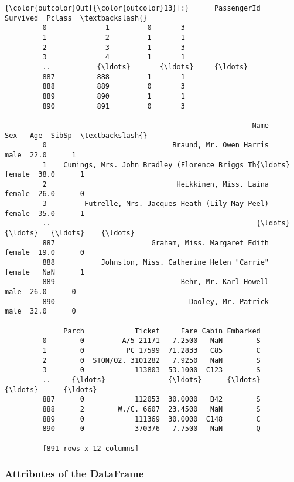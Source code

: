 \documentclass[11pt]{article}
\begin{document}
\begin{Verbatim}[commandchars=\\\{\}]
{\color{outcolor}Out[{\color{outcolor}13}]:}      PassengerId  Survived  Pclass  \textbackslash{}
         0              1         0       3   
         1              2         1       1   
         2              3         1       3   
         3              4         1       1   
         ..           {\ldots}       {\ldots}     {\ldots}   
         887          888         1       1   
         888          889         0       3   
         889          890         1       1   
         890          891         0       3   
         
                                                           Name     Sex   Age  SibSp  \textbackslash{}
         0                              Braund, Mr. Owen Harris    male  22.0      1   
         1    Cumings, Mrs. John Bradley (Florence Briggs Th{\ldots}  female  38.0      1   
         2                               Heikkinen, Miss. Laina  female  26.0      0   
         3         Futrelle, Mrs. Jacques Heath (Lily May Peel)  female  35.0      1   
         ..                                                 {\ldots}     {\ldots}   {\ldots}    {\ldots}   
         887                       Graham, Miss. Margaret Edith  female  19.0      0   
         888           Johnston, Miss. Catherine Helen "Carrie"  female   NaN      1   
         889                              Behr, Mr. Karl Howell    male  26.0      0   
         890                                Dooley, Mr. Patrick    male  32.0      0   
         
              Parch            Ticket     Fare Cabin Embarked  
         0        0         A/5 21171   7.2500   NaN        S  
         1        0          PC 17599  71.2833   C85        C  
         2        0  STON/O2. 3101282   7.9250   NaN        S  
         3        0            113803  53.1000  C123        S  
         ..     {\ldots}               {\ldots}      {\ldots}   {\ldots}      {\ldots}  
         887      0            112053  30.0000   B42        S  
         888      2        W./C. 6607  23.4500   NaN        S  
         889      0            111369  30.0000  C148        C  
         890      0            370376   7.7500   NaN        Q  
         
         [891 rows x 12 columns]
\end{Verbatim}
            
    \hypertarget{attributes-of-the-dataframe}{%
\subsubsection{Attributes of the
DataFrame}\label{attributes-of-the-dataframe}}
\end{document}
